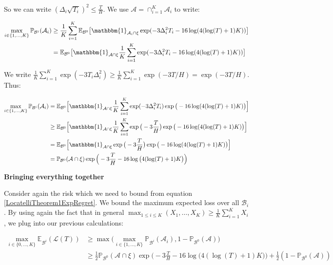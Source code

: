 \documentclass[11pt,]{article}
\begin{document}
So we can write \((\Delta_i \sqrt{T_i})^2 \leq \frac{T}{H}\). We use
\(\mathcal{A} = \cap_{i=1}^K \mathcal{A}_i\) to write:

\begin{align*}
\max_{i \in \{1,\dots,K\}} \mathbb{P}_{\mathcal{B}^i}(\mathcal{A}_i) & \geq \frac{1}{K} \sum_{i=1}^{K} \mathbb{E}_{\mathcal{B}^0} \big[\mathbbm{1}_{\mathcal{A}_i \cap \xi} \exp (- 3 \Delta_i^2 T_i - 16 \log(4(\log(T)+1)K)) \big] \\
& = \mathbb{E}_{\mathcal{B}^0} \big[\mathbbm{1}_{\mathcal{A} \cap \xi} \frac{1}{K} \sum_{i=1}^{K} \exp (- 3 \Delta_i^2 T_i - 16 \log(4(\log(T)+1)K)) \big]
\end{align*}

We write
\(\frac{1}{K} \sum_{i=1}^K \exp(-3T_i \Delta_i^2) \geq \frac{1}{K} \sum_{i=1}^K \exp(-3 T/H) = \exp(-3 T/H)\).
Thus:

\begin{align*}
\max_{i \in \{1,\dots,K\}} \mathbb{P}_{\mathcal{B}^i}(\mathcal{A}_i) & = \mathbb{E}_{\mathcal{B}^0} \Big[\mathbbm{1}_{\mathcal{A} \cap \xi} \frac{1}{K} \sum_{i=1}^{K} \exp (- 3 \Delta_i^2 T_i) \exp \big(-16 \log(4(\log(T)+1)K)\big) \Big] \\
& \geq \mathbb{E}_{\mathcal{B}^0} \Big[\mathbbm{1}_{\mathcal{A} \cap \xi} \frac{1}{K} \sum_{i=1}^{K} \exp \big(- 3 \frac{T}{H}\big) \exp \big(-16 \log(4(\log(T)+1)K)\big) \Big] \\
& = \mathbb{E}_{\mathcal{B}^0} \Big[\mathbbm{1}_{\mathcal{A} \cap \xi} \exp \big(- 3 \frac{T}{H}\big) \exp \big(-16 \log(4(\log(T)+1)K)\big) \Big] \\
& = \mathbb{P}_{\mathcal{B}^0} (\mathcal{A} \cap \xi) \exp \Big(- 3 \frac{T}{H} -16 \log \big(4(\log(T)+1)K\big)\Big)
\end{align*}

\textbf{Bringing everything together}

Consider again the risk which we need to bound from equation
\eqref{LocatelliTheorem1ExpRegret}. We bound the maximum expected loss
over all \(\mathcal{B}_i\). By using again the fact that in general
\(\max_{1 \leq i \leq K} (X_1, \dots, X_K) \geq \frac{1}{K} \sum_{i = 1}^K X_i\),
we plug into our previous calculations:

\begin{align}
\max_{i \in \{0, \dots, K\}} \mathbb{E}_{\mathcal{B}^i} (\mathcal{L}(T)) & \geq \max \big( \max_{i \in \{1, \dots, K\}} \mathbb{P}_{\mathcal{B}^i}(\mathcal{A}_i), 1 - \mathbb{P}_{\mathcal{B}^0}(\mathcal{A}) \big) \\
& \geq \frac{1}{2}\mathbb{P}_{\mathcal{B}^0} (\mathcal{A} \cap \xi) \exp \Big(- 3 \frac{T}{H} -16 \log \big(4(\log(T)+1)K\big)\Big) + \frac{1}{2}(1 - \mathbb{P}_{\mathcal{B}^0}(\mathcal{A})) \label{LocatelliTheorem1DefinitionOfRisk}
\end{align}
\end{document}
